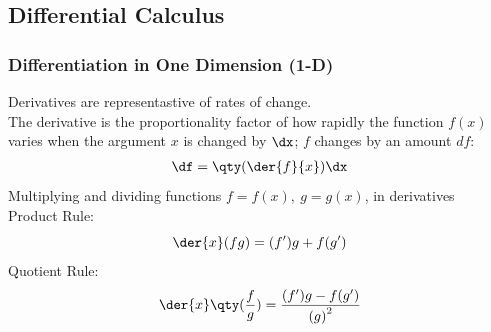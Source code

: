 \subsection{Differential Calculus}
    \subsubsection*{Differentiation in One Dimension (1-D)}
        Derivatives are representastive of rates of change.\\
        The derivative is the proportionality factor of how rapidly the function \(f(x)\) varies when the argument \(x\) is changed by \(\dx\); \(f\) changes by an amount \(df\):
        \begin{align*}
            \df = \qty(\der{f}{x})\dx
        \end{align*}
        Multiplying and dividing functions $f=f(x),~g=g(x)$, in derivatives 
        \\
        Product Rule:
        \begin{equation}
            \der{x}(fg)=(f')g+f(g')
        \end{equation}
        Quotient Rule:
        \begin{equation}
            \der{x}\qty(\frac{f}{g})=\frac{(f')g-f(g')}{{(g)}^2}
        \end{equation}
